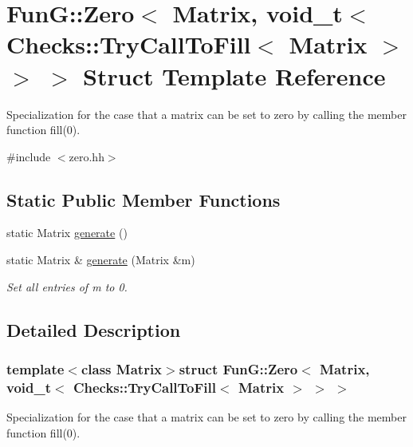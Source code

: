 \hypertarget{structFunG_1_1Zero_3_01Matrix_00_01void__t_3_01Checks_1_1TryCallToFill_3_01Matrix_01_4_01_4_01_4}{\section{Fun\-G\-:\-:Zero$<$ Matrix, void\-\_\-t$<$ Checks\-:\-:Try\-Call\-To\-Fill$<$ Matrix $>$ $>$ $>$ Struct Template Reference}
\label{structFunG_1_1Zero_3_01Matrix_00_01void__t_3_01Checks_1_1TryCallToFill_3_01Matrix_01_4_01_4_01_4}
}


Specialization for the case that a matrix can be set to zero by calling the member function fill(0).  




{\ttfamily \#include $<$zero.\-hh$>$}

\subsection*{Static Public Member Functions}
\begin{DoxyCompactItemize}
\item 
static Matrix \hyperlink{structFunG_1_1Zero_3_01Matrix_00_01void__t_3_01Checks_1_1TryCallToFill_3_01Matrix_01_4_01_4_01_4_aad40134e73459a1e0a86c5bb8ceee730}{generate} ()
\item 
static Matrix \& \hyperlink{structFunG_1_1Zero_3_01Matrix_00_01void__t_3_01Checks_1_1TryCallToFill_3_01Matrix_01_4_01_4_01_4_a929e1d03c899d4badbb7a3f6fa701e8c}{generate} (Matrix \&m)
\begin{DoxyCompactList}\small\item\em Set all entries of m to 0. \end{DoxyCompactList}\end{DoxyCompactItemize}


\subsection{Detailed Description}
\subsubsection*{template$<$class Matrix$>$struct Fun\-G\-::\-Zero$<$ Matrix, void\-\_\-t$<$ Checks\-::\-Try\-Call\-To\-Fill$<$ Matrix $>$ $>$ $>$}

Specialization for the case that a matrix can be set to zero by calling the member function fill(0). 

